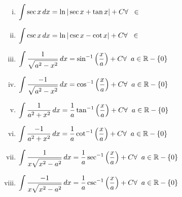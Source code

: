 \documentclass{article}
\begin{document}
\begin{enumerate}[i.]
    \item $\displaystyle\int \sec x \, dx=\ln |\sec x + \tan x| +C \hfill \forall \hspace{2mm}  \in $
    \item $\displaystyle\int \csc x \, dx=\ln |\csc x-\cot x| +C \hfill \forall \hspace{2mm}  \in $
    \item $\displaystyle\int \dfrac{1}{\displaystyle\sqrt{a^2-x^2}} \, dx=\sin^{-1} \left(\dfrac{x}{a}\right) +C \hfill \forall \hspace{2mm}  a\in \mathbb{R}-\left\{0\right\}$
    \item $\displaystyle\int \dfrac{-1}{\displaystyle\sqrt{a^2-x^2}} \, dx=\cos^{-1} \left(\frac{x}{a}\right) +C \hfill \forall \hspace{2mm}  a\in\mathbb{R}-\left\{0\right\} $
    \item $\displaystyle\int \dfrac{1}{a^2+x^2} \, dx=\frac{1}{a} \tan^{-1}\left(\frac{x}{a}\right)+C \hfill \forall \hspace{2mm} a \in \mathbb{R}-\left\{0\right\}$
    \item $\displaystyle\int \dfrac{-1}{a^2+x^2} \, dx=\frac{1}{a} \cot^{-1}\left(\frac{x}{a}\right)+C \hfill \forall \hspace{2mm} a \in \mathbb{R}-\left\{0\right\}$
    \item $\displaystyle\int \frac{1}{x\displaystyle\sqrt{x^2-a^2}} \, dx=\frac{1}{a}\sec^{-1}\left(\frac{x}{a}\right)  +C \hfill \forall \hspace{2mm} a \in \mathbb{R}-\left\{0\right\}$
    \item $\displaystyle\int \dfrac{-1}{x\displaystyle\sqrt{x^2-a^2}} \, dx=\frac{1}{a}\csc^{-1}\left(\frac{x}{a}\right) +C \hfill \forall \hspace{2mm} a \in \mathbb{R}-\left\{0\right\}$

\end{enumerate}
\end{document}

